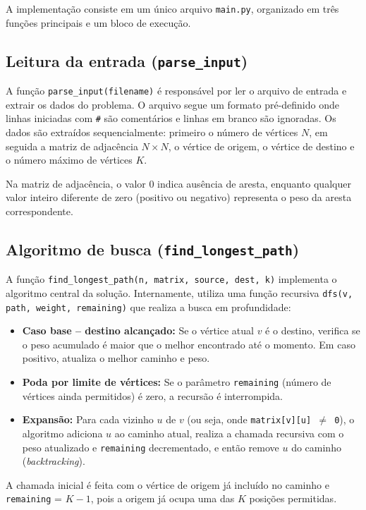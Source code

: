 \documentclass[12pt]{article}
\begin{document}
A implementação consiste em um único arquivo \texttt{main.py}, organizado em três funções principais e um bloco de execução.

\subsection{Leitura da entrada (\texttt{parse\_input})}

A função \texttt{parse\_input(filename)} é responsável por ler o arquivo de entrada e extrair os dados do problema. O arquivo segue um formato pré-definido onde linhas iniciadas com \texttt{\#} são comentários e linhas em branco são ignoradas. Os dados são extraídos sequencialmente: primeiro o número de vértices $N$, em seguida a matriz de adjacência $N \times N$, o vértice de origem, o vértice de destino e o número máximo de vértices $K$.

Na matriz de adjacência, o valor 0 indica ausência de aresta, enquanto qualquer valor inteiro diferente de zero (positivo ou negativo) representa o peso da aresta correspondente.

\subsection{Algoritmo de busca (\texttt{find\_longest\_path})}

A função \texttt{find\_longest\_path(n, matrix, source, dest, k)} implementa o algoritmo central da solução. Internamente, utiliza uma função recursiva \texttt{dfs(v, path, weight, remaining)} que realiza a busca em profundidade:

\begin{itemize}
  \item \textbf{Caso base -- destino alcançado:} Se o vértice atual $v$ é o destino, verifica se o peso acumulado é maior que o melhor encontrado até o momento. Em caso positivo, atualiza o melhor caminho e peso.
  \item \textbf{Poda por limite de vértices:} Se o parâmetro \texttt{remaining} (número de vértices ainda permitidos) é zero, a recursão é interrompida.
  \item \textbf{Expansão:} Para cada vizinho $u$ de $v$ (ou seja, onde \texttt{matrix[v][u] $\neq$ 0}), o algoritmo adiciona $u$ ao caminho atual, realiza a chamada recursiva com o peso atualizado e \texttt{remaining} decrementado, e então remove $u$ do caminho (\textit{backtracking}).
\end{itemize}

A chamada inicial é feita com o vértice de origem já incluído no caminho e \texttt{remaining} = $K - 1$, pois a origem já ocupa uma das $K$ posições permitidas.
\end{document}
